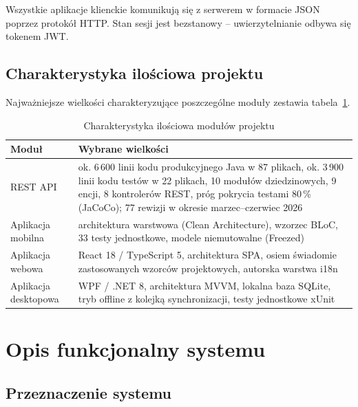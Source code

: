 \documentclass[12pt,a4paper]{article}
\begin{document}
Wszystkie aplikacje klienckie komunikuj\k{a} si\k{e} z serwerem w formacie JSON poprzez protok\'o\l{} HTTP. Stan sesji jest bezstanowy -- uwierzytelnianie odbywa si\k{e} tokenem JWT.

\subsection{Charakterystyka ilo\'sciowa projektu}

Najwa\.zniejsze wielko\'sci charakteryzuj\k{a}ce poszczeg\'olne modu\l{}y zestawia tabela~\ref{tab:liczby}.

\begin{table}[htbp]
\centering
\caption{Charakterystyka ilo\'sciowa modu\l{}\'ow projektu}
\label{tab:liczby}
\vspace{0.3em}
\begin{tabularx}{\textwidth}{@{}lX@{}}
\toprule
\textbf{Modu\l{}} & \textbf{Wybrane wielko\'sci} \\
\midrule
REST API & ok. 6\,600 linii kodu produkcyjnego Java w 87 plikach, ok. 3\,900 linii kodu test\'ow w 22 plikach, 10 modu\l{}\'ow dziedzinowych, 9 encji, 8 kontroler\'ow REST, pr\'og pokrycia testami 80\,\% (JaCoCo); 77 rewizji w okresie marzec--czerwiec 2026 \\
\addlinespace
Aplikacja mobilna & architektura warstwowa (Clean Architecture), wzorzec BLoC, 33 testy jednostkowe, modele niemutowalne (Freezed) \\
\addlinespace
Aplikacja webowa & React 18 / TypeScript 5, architektura SPA, osiem \'swiadomie zastosowanych wzorc\'ow projektowych, autorska warstwa i18n \\
\addlinespace
Aplikacja desktopowa & WPF / .NET 8, architektura MVVM, lokalna baza SQLite, tryb offline z kolejk\k{a} synchronizacji, testy jednostkowe xUnit \\
\bottomrule
\end{tabularx}
\end{table}

\section{Opis funkcjonalny systemu}

\subsection{Przeznaczenie systemu}
\end{document}
